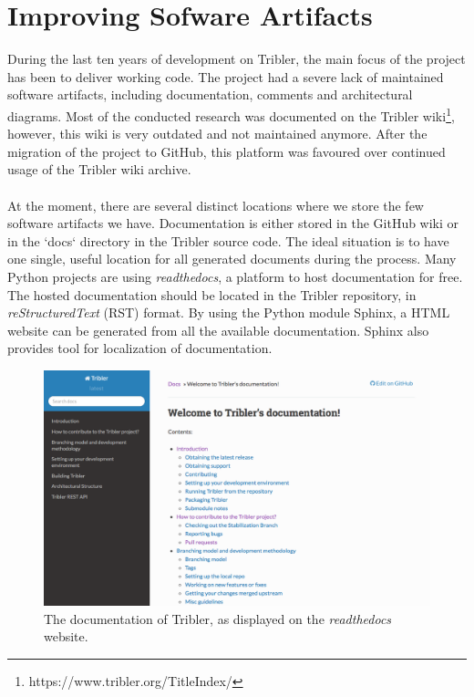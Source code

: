 \section{Improving Sofware Artifacts}
During the last ten years of development on Tribler, the main focus of the project has been to deliver working code. The project had a severe lack of maintained software artifacts, including documentation, comments and architectural diagrams. Most of the conducted research was documented on the Tribler wiki\footnote{https://www.tribler.org/TitleIndex/}, however, this wiki is very outdated and not maintained anymore. After the migration of the project to GitHub, this platform was favoured over continued usage of the Tribler wiki archive.\\\\
At the moment, there are several distinct locations where we store the few software artifacts we have. Documentation is either stored in the GitHub wiki or in the `docs` directory in the Tribler source code. The ideal situation is to have one single, useful location for all generated documents during the process. Many Python projects are using \emph{readthedocs}, a platform to host documentation for free. The hosted documentation should be located in the Tribler repository, in \emph{reStructuredText} (RST) format. By using the Python module Sphinx, a HTML website can be generated from all the available documentation. Sphinx also provides tool for localization of documentation.

\begin{figure}[h!]
	\centering
	\includegraphics[width=1.0\columnwidth]{images/improving_qa/readthedocs}
	\caption{The documentation of Tribler, as displayed on the \emph{readthedocs} website.}
	\label{fig:old-threading-model}
\end{figure}

